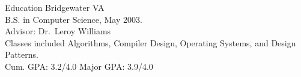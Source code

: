 \documentclass{resume}
\begin{document}
\begin{category}{Education}
 Bridgewater VA\\
    B.S. in Computer Science, May 2003.\\
    Advisor: Dr.\ Leroy Williams\\
    Classes included Algorithms, Compiler Design, Operating Systems, and
    Design Patterns.\\
    Cum. GPA\@: 3.2/4.0 Major GPA\@: 3.9/4.0
\end{category}
\end{document}

